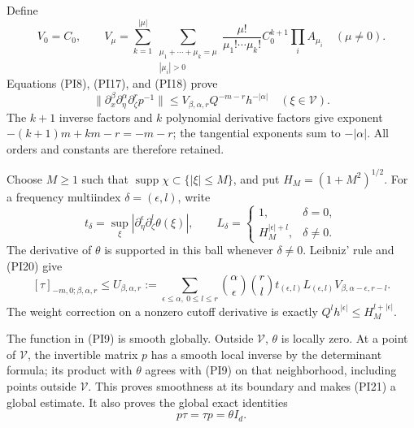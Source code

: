 \documentclass[
  11pt,
]{article}
\makeatletter
\let\ReaderOriginalAnchorStart\hyper@anchorstart
\let\ReaderOriginalAnchorEnd\hyper@anchorend
\let\ReaderPendingAliases\@empty
\def\ReaderArmAliases#1{\gdef\ReaderPendingAliases{#1}}
\def\hyper@anchorstart#1{\ReaderIfNativeAnchorTF{#1}{\ReaderPendingAliases\global\let\ReaderPendingAliases\@empty}{}\ReaderOriginalAnchorStart{#1}}
\makeatother
\begin{document}
Define \[
 V_0=C_0,\qquad
 V_\mu=
 \sum_{k=1}^{|\mu|}
 \sum_{\substack{\mu_1+\cdots+\mu_k=\mu\\|\mu_i|>0}}
 \frac{\mu!}{\mu_1!\cdots\mu_k!}
 C_0^{k+1}\prod_i A_{\mu_i}
 \quad(\mu\ne0).
 \tag{PI19}
\] Equations (PI8), (PI17), and (PI18) prove \[
 \|\partial_x^\beta\partial_\eta^\alpha\partial_\zeta^r p^{-1}\|
 \leq V_{\beta,\alpha,r}Q^{-m-r}h^{-|\alpha|}
 \quad(\xi\in\mathcal V).
 \tag{PI20}
\] The \(k+1\) inverse factors and \(k\) polynomial derivative factors
give exponent \(-(k+1)m+km-r=-m-r\); the tangential exponents sum to
\(-|\alpha|\). All orders and constants are therefore retained.

Choose \(M\geq1\) such that
\(\operatorname{supp}\chi\subset\{|\xi|\leq M\}\), and put
\(H_M=(1+M^2)^{1/2}\). For a frequency multiindex
\(\delta=(\epsilon,l)\), write \[
 t_\delta=\sup_\xi|\partial_\eta^\epsilon\partial_\zeta^l\theta(\xi)|,\qquad
 L_\delta=\begin{cases}1,&\delta=0,\\H_M^{|\epsilon|+l},&\delta\ne0.\end{cases}
\] The derivative of \(\theta\) is supported in this ball whenever
\(\delta\ne0\). Leibniz' rule and (PI20) give \[
 [\tau]_{-m,0;\beta,\alpha,r}
 \leq U_{\beta,\alpha,r}
 :=\sum_{\epsilon\leq\alpha,\ 0\leq l\leq r}
 \binom\alpha\epsilon\binom rl
 t_{(\epsilon,l)}L_{(\epsilon,l)}
 V_{\beta,\alpha-\epsilon,r-l}.
 \tag{PI21}
\] The weight correction on a nonzero cutoff derivative is exactly
\(Q^lh^{|\epsilon|}\leq H_M^{l+|\epsilon|}\).

The function in (PI9) is smooth globally. Outside \(\mathcal V\),
\(\theta\) is locally zero. At a point of \(\mathcal V\), the invertible
matrix \(p\) has a smooth local inverse by the determinant formula; its
product with \(\theta\) agrees with (PI9) on that neighborhood,
including points outside \(\mathcal V\). This proves smoothness at its
boundary and makes (PI21) a global estimate. It also proves the global
exact identities \[
 p\tau=\tau p=\theta I_d.
 \tag{PI22}
\]

\ReaderArmAliases{\ReaderOriginalAnchorStart{AN03-PIN-004}\ReaderOriginalAnchorEnd\begingroup\expandafter\def\csname @currentHref\endcsname{AN03-PIN-004}\label{AN03-PIN-004}\endgroup\ReaderOriginalAnchorStart{an03-pin-004-re-expression-in-the-unchanged-complex-normal-coordinate}\ReaderOriginalAnchorEnd\begingroup\expandafter\def\csname @currentHref\endcsname{an03-pin-004-re-expression-in-the-unchanged-complex-normal-coordinate}\label{an03-pin-004-re-expression-in-the-unchanged-complex-normal-coordinate}\endgroup\ReaderOriginalAnchorStart{4-re-expression-in-the-unchanged-complex-normal-coordinate}\ReaderOriginalAnchorEnd\begingroup\expandafter\def\csname @currentHref\endcsname{4-re-expression-in-the-unchanged-complex-normal-coordinate}\label{4-re-expression-in-the-unchanged-complex-normal-coordinate}\endgroup}
\end{document}

